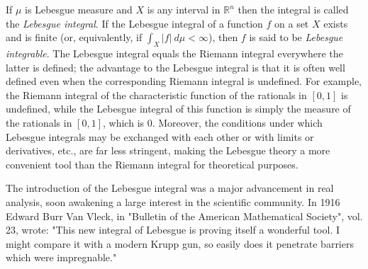 \documentclass[12pt]{article}
\newcommand{\1}{{{\bf 1}}}
\begin{document}
If $\mu$ is Lebesgue measure and $X$ is any interval in $\mathbb{R}^{n}$ then the integral is called the \emph{Lebesgue integral}.  If the Lebesgue integral of a function $f$ on a set $X$ exists and is finite (or, equivalently, if $\int_X |f|\ d\mu < \infty$), then $f$ is said to be \emph{Lebesgue integrable}.  The Lebesgue integral equals the Riemann integral everywhere the latter is defined; the advantage to the Lebesgue integral is that it is often well defined even when the corresponding Riemann integral is undefined. For example, the Riemann integral of the characteristic function of the rationals in $[0,1]$ is undefined, while the Lebesgue integral of this function is simply the measure of the rationals in $[0,1]$, which is 0. Moreover, the conditions under which Lebesgue integrals may be exchanged with each other or with limits or derivatives, etc., are far less stringent, making the Lebesgue theory a more convenient tool than the Riemann integral for theoretical purposes.

The introduction of the Lebesgue integral was a major advancement in real analysis, soon awakening a large interest in the scientific community. In 1916 Edward Burr Van Vleck, in "Bulletin of the American Mathematical Society", vol. 23, wrote: "This new integral of Lebesgue is proving itself a wonderful tool. I might compare it with a modern Krupp gun, so easily does it penetrate barriers which were impregnable."
\end{document}
